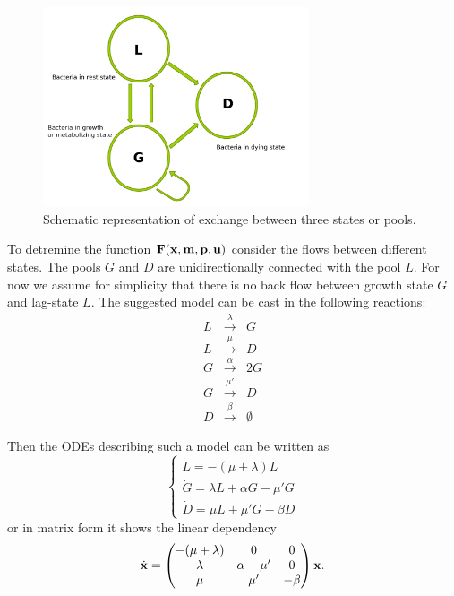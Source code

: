 \documentclass[10pt,A4paper]{article}
\begin{document}
\begin{figure}[t]
    \begin{center}
    \includegraphics[width=0.7\textwidth]{Figures/TPM_fig.pdf}
    \caption{{\footnotesize Schematic representation of exchange between three states or pools.}}
    \label{fig:SchematicRep}
    \end{center}
\end{figure}

To detremine the function $\mathbf{F}(\mathbf{x}, \mathbf{m}, \mathbf{p}, \mathbf{u})$ consider the flows between different states.
The pools $G$ and $D$ are unidirectionally connected with the pool $L$. 
For now we assume for simplicity that there is no back flow between growth state $G$ and lag-state $L$. 
The suggested model can be cast in the following reactions:
\begin{eqnarray}
L &\stackrel{\lambda}{\longrightarrow} & G\\
L &\stackrel{\mu}{\longrightarrow} & D\\
G &\stackrel{\alpha}{\longrightarrow} & 2G\\
G &\stackrel{\mu'}{\longrightarrow} & D\\
D &\stackrel{\beta}{\longrightarrow} & \emptyset
\end{eqnarray}

Then the ODEs describing such a model can be written as 
\begin{equation}
\begin{cases}
    \dot{L} = -(\mu + \lambda) L\\
    \dot{G} = \lambda L + \alpha G - \mu' G\\
    \dot{D} = \mu  L + \mu' G- \beta D  
\end{cases}
\end{equation}
or in matrix form it shows the linear dependency
\begin{equation}
    \dot {\mathbf{x}}  = \begin{pmatrix}
                    -(\mu + \lambda) & 0             & 0      \\
                    \lambda          & \alpha - \mu' & 0      \\
                    \mu              & \mu'          & -\beta 
                 \end{pmatrix} \mathbf{x} .
\end{equation}
\end{document}
